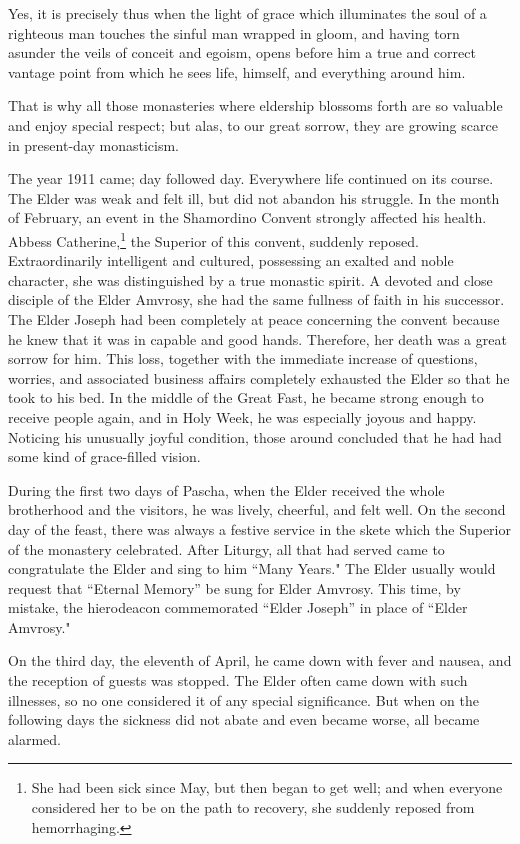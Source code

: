 Yes, it is precisely thus when the light of grace which illuminates the soul of a righteous man touches the sinful man wrapped in gloom, and having torn asunder the veils of conceit and egoism, opens before him a true and correct vantage point from which he sees life, himself, and everything around him.

That is why all those monasteries where eldership blossoms forth are so valuable and enjoy special respect; but alas, to our great sorrow, they are growing scarce in present-day monasticism.

The year 1911 came; day followed day. Everywhere life continued on its course. The Elder was weak and felt ill, but did not abandon his struggle. In the month of February, an event in the Shamordino Convent strongly affected his health. Abbess Catherine,\footnote{She had been sick since May, but then began to get well; and when everyone considered her to be on the path to recovery, she suddenly reposed from hemorrhaging.} the Superior of this convent, suddenly reposed. Extraordinarily intelligent and cultured, possessing an exalted and noble character, she was distinguished by a true monastic spirit. A devoted and close disciple of the Elder Amvrosy, she had the same fullness of faith in his successor. The Elder Joseph had been completely at peace concerning the convent because he knew that it was in capable and good hands. Therefore, her death was a great sorrow for him. This loss, together with the immediate increase of questions, worries, and associated business affairs completely exhausted the Elder so that he took to his bed. In the middle of the Great Fast, he became strong enough to receive people again, and in Holy Week, he was especially joyous and happy. Noticing his unusually joyful condition, those around concluded that he had had some kind of grace-filled vision.

During the first two days of Pascha, when the Elder received the whole brotherhood and the visitors, he was lively, cheerful, and felt well. On the second day of the feast, there was always a festive service in the skete which the Superior of the monastery celebrated. After Liturgy, all that had served came to congratulate the Elder and sing to him “Many Years." The Elder usually would request that “Eternal Memory” be sung for Elder Amvrosy. This time, by mistake, the hierodeacon commemorated “Elder Joseph” in place of “Elder Amvrosy."

On the third day, the eleventh of April, he came down with fever and nausea, and the reception of guests was stopped. The Elder often came down with such illnesses, so no one considered it of any special significance. But when on the following days the sickness did not abate and even became worse, all became alarmed.

